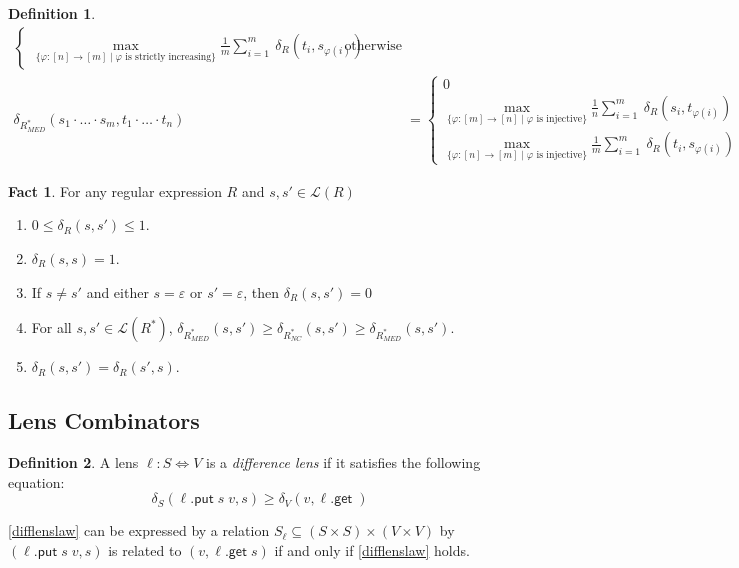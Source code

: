 \documentclass[acmsmall,review,anonymous]{acmart}\settopmatter{printfolios=true,printccs=false,printacmref=false}
\theoremstyle{definition}
\newtheorem{definition}{Definition}
\newtheorem{fact}{Fact}
\newcommand{\kw}[1]{\ensuremath{\mathsf{#1}}\xspace}
\newcommand{\get}{\ensuremath{\kw{get}}\xspace}
\newcommand{\pput}{\ensuremath{\kw{put}}\xspace}
\begin{document}
\begin{definition}
\begin{align*}
\begin{cases}
\max\limits_{\{\varphi : [n] \longrightarrow [m] \; | \; \varphi \text{ is strictly increasing}\}}\frac{1}{m}\sum\limits_{i=1}^{m}\ \delta_R(t_i, s_{\varphi(i)})& \text{otherwise}
\end{cases}\\
\delta_{R^*_{MED}}(s_1 \cdot \ldots \cdot s_m, t_1 \cdot \ldots \cdot t_n) &= 
\begin{cases}
0 & \text{if } m=0 \text{ or } n=0\\
\max\limits_{\{\varphi : [m] \longrightarrow [n] \; | \; \varphi \text{ is injective}\}}\frac{1}{n}\sum\limits_{i=1}^{m}\ \delta_R(s_i, t_{\varphi(i)})& \text{if } m \leq n\\
\max\limits_{\{\varphi : [n] \longrightarrow [m] \; | \; \varphi \text{ is injective}\}}\frac{1}{m}\sum\limits_{i=1}^{m}\ \delta_R(t_i, s_{\varphi(i)})& \text{otherwise}
\end{cases}
\end{align*}
\end{definition}
\begin{fact}
For any regular expression $R$ and $s, s' \in \mathcal{L}(R)$
\begin{enumerate}
\item
$0 \leq \delta_R(s, s') \leq 1$.
\item
$\delta_R(s, s) = 1$.
\item
If $s \neq s'$ and either $s = \varepsilon$ or $s' = \varepsilon$, then $\delta_R(s, s') = 0$
\item
For all $s, s' \in \mathcal{L}(R^*)$, $\delta_{R^*_{MED}}(s, s') \geq \delta_{R^*_{NC}}(s, s') \geq \delta_{R^*_{MED}}(s, s')$.
\item
$\delta_R(s, s') = \delta_R(s', s)$.
\end{enumerate}

\end{fact}
\subsection{Lens Combinators}
\begin{definition}
A lens $\ell : S \Leftrightarrow V$ is a {\em difference lens} if it satisfies the following equation:
\begin{equation}\label{difflenslaw}
\delta_S(\ell.\pput \; s \;v, s) \geq \delta_V(v, \ell.\get \; )
\end{equation}
\end{definition}
\cref{difflenslaw} can be expressed by a relation $S_{\ell} \subseteq (S \times S) \times (V \times V)$ by $(\ell.\pput \; s \;v, s)$ is related to $(v, \ell.\get \; s)$ if and only if \cref{difflenslaw} holds.
\end{document}
